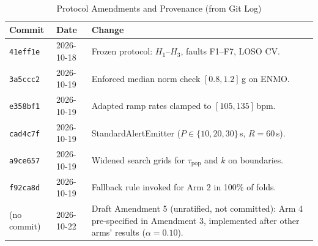 \begin{table}[t]
\caption{Protocol Amendments and Provenance (from Git Log)}
\label{tab:amendments}
\centering
\scriptsize
\renewcommand{\arraystretch}{0.85}
\setlength{\tabcolsep}{2.5pt}
\begin{tabular}{|p{1.7cm}|p{1.3cm}|p{4.8cm}|}
\hline
\textbf{Commit} & \textbf{Date} & \textbf{Change} \\
\hline
\texttt{41eff1e} & 2026-10-18 & Frozen protocol: $H_1$--$H_3$, faults F1--F7, LOSO CV. \\
\hline
\texttt{3a5ccc2} & 2026-10-19 & Enforced median norm check $[0.8, 1.2]$\,g on ENMO. \\
\hline
\texttt{e358bf1} & 2026-10-19 & Adapted ramp rates clamped to $[105, 135]$\,bpm. \\
\hline
\texttt{cad4c7f} & 2026-10-19 & StandardAlertEmitter ($P \in \{10, 20, 30\}$\,s, $R = 60$\,s). \\
\hline
\texttt{a9ce657} & 2026-10-19 & Widened search grids for $\tau_{\text{pop}}$ and $k$ on boundaries. \\
\hline
\texttt{f92ca8d} & 2026-10-19 & Fallback rule invoked for Arm 2 in 100\% of folds. \\
\hline
(no commit) & 2026-10-22 & Draft Amendment 5 (unratified, not committed): Arm 4 pre-specified in Amendment 3, implemented after other arms' results ($\alpha = 0.10$). \\
\hline
\end{tabular}
\end{table}
